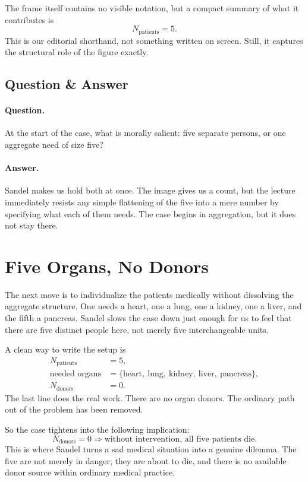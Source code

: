 The frame itself contains no visible notation, but a compact summary of what it contributes is
\begin{equation}
N_{\text{patients}} = 5.
\end{equation}
This is our editorial shorthand, not something written on screen. Still, it captures the structural role of the figure exactly.

\subsection{Question \& Answer}

\paragraph{Question.} At the start of the case, what is morally salient: five separate persons, or one aggregate need of size five?

\paragraph{Answer.} Sandel makes us hold both at once. The image gives us a count, but the lecture immediately resists any simple flattening of the five into a mere number by specifying what each of them needs. The case begins in aggregation, but it does not stay there.

\section{Five Organs, No Donors}

The next move is to individualize the patients medically without dissolving the aggregate structure. One needs a heart, one a lung, one a kidney, one a liver, and the fifth a pancreas. Sandel slows the case down just enough for us to feel that there are five distinct people here, not merely five interchangeable units.

A clean way to write the setup is
\begin{align}
N_{\text{patients}} &= 5,\\
\text{needed organs} &= \{\text{heart},\ \text{lung},\ \text{kidney},\ \text{liver},\ \text{pancreas}\},\\
N_{\text{donors}} &= 0.
\end{align}
The last line does the real work. There are no organ donors. The ordinary path out of the problem has been removed.

So the case tightens into the following implication:
\begin{equation}
N_{\text{donors}} = 0
\Longrightarrow
\text{without intervention, all five patients die}.
\end{equation}
This is where Sandel turns a sad medical situation into a genuine dilemma. The five are not merely in danger; they are about to die, and there is no available donor source within ordinary medical practice.

